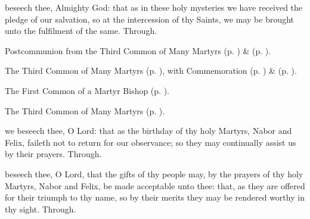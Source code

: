 
\postcommunion
{} beseech thee, Almighty God: that as in these holy mysteries we have received the pledge of our salvation, so at the intercession of thy Saints, we may be brought unto the fulfilment of the same. Through.

\begin{rubric}
	 Postcommunion  from the Third Common of Many Martyrs (p. \pageref{CommonMartyrsIIIPostcommunion}) \&   (p. \pageref{SPSaints}).
\end{rubric}



\begin{rubric}
	The Third Common of Many Martyrs (p. \pageref{CommonMartyrsIII}), with Commemoration  (p. \pageref{SevenHolyBrothers}) \&  (p. \pageref{SPSaints}).
\end{rubric}



\begin{rubric}
	The First Common of a Martyr Bishop (p. \pageref{CommonMartyrBishopI}).
\end{rubric}



\begin{rubric}
	The Third Common of Many Martyrs (p. \pageref{CommonMartyrsIII}).
\end{rubric}

\collect
{} we beseech thee, O Lord: that as the birthday of thy holy Martyrs, Nabor and Felix, faileth not to return for our observance; so they may continually assist us by their prayers. Through.

\secret
{} beseech thee, O Lord, that the gifts of thy people may, by the prayers of thy holy Martyrs, Nabor and Felix, be made acceptable unto thee: that, as they are offered for their triumph to thy name, so by their merits they may be rendered worthy in thy sight. Through.

